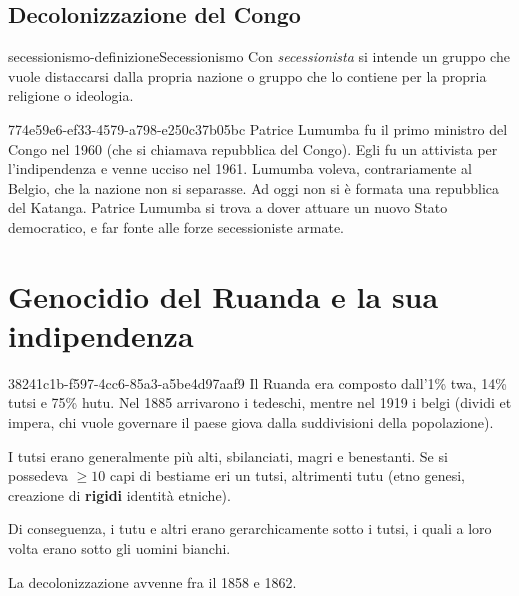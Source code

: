 \documentclass[preview]{standalone}
\begin{document}
\subsection{Decolonizzazione del Congo}


\begin{snippetdefinition}{secessionismo-definizione}{Secessionismo}
    Con \textit{secessionista} si intende un gruppo che vuole distaccarsi
    dalla propria nazione o gruppo che lo contiene per la propria religione o ideologia.
\end{snippetdefinition}

\begin{snippet}{774e59e6-ef33-4579-a798-e250c37b05bc}
    Patrice Lumumba fu il primo ministro del Congo nel 1960 (che si chiamava repubblica del Congo).
    Egli fu un attivista per l'indipendenza e venne ucciso nel 1961.
    Lumumba voleva, contrariamente al Belgio, che la nazione non si separasse.
    Ad oggi non si è formata una repubblica del Katanga.
    Patrice Lumumba si trova a dover attuare un nuovo Stato democratico,
    e far fonte alle forze secessioniste armate.
    
    
\end{snippet}

\section{Genocidio del Ruanda e la sua indipendenza}

\begin{snippet}{38241c1b-f597-4cc6-85a3-a5be4d97aaf9}
    Il Ruanda era composto dall'1\% twa, 14\% tutsi e 75\% hutu.
    Nel 1885 arrivarono i tedeschi, mentre nel 1919 i belgi (dividi et impera, chi vuole governare
    il paese giova dalla suddivisioni della popolazione).
    
    I tutsi erano generalmente più alti, sbilanciati, magri e benestanti.
    Se si possedeva \(\geq 10\) capi di bestiame eri un tutsi, altrimenti tutu (etno genesi,
    creazione di \textbf{rigidi} identità etniche).
    
    Di conseguenza, i tutu e altri erano gerarchicamente sotto i tutsi, i quali a loro volta
    erano sotto gli uomini bianchi.
    
    La decolonizzazione avvenne fra il 1858 e 1862.
    
\end{snippet}
\end{document}
